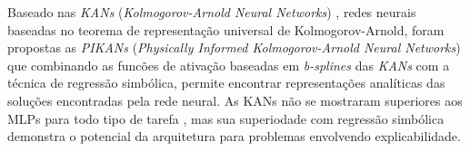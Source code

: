 Baseado nas \textit{KANs} (\textit{Kolmogorov-Arnold Neural Networks})
\cite{liu-etal:2025-kans}, redes neurais baseadas no teorema de representação 
universal de Kolmogorov-Arnold, foram propostas as \textit{PIKANs} 
(\textit{Physically Informed Kolmogorov-Arnold Neural Networks})
que combinando as funcões de ativação baseadas em \textit{b-splines} das
\textit{KANs} com a técnica de regressão simbólica, permite encontrar  
representações analíticas das soluções encontradas pela rede neural.
As KANs não se mostraram superiores aos MLPs para todo tipo de tarefa 
\cite{toscano:2025-pinns-para-pikans}, mas sua superiodade com regressão simbólica
demonstra o potencial da arquitetura para problemas envolvendo explicabilidade.

